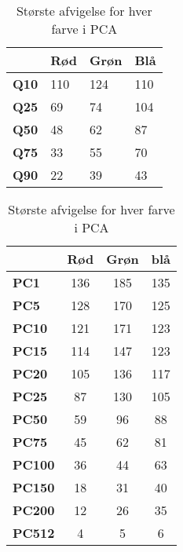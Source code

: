 \begin{table}
\begin{minipage}[b]{0.45\textwidth}
\centering
\begin{tabular}{|l|l|l|l|}
\hline
	& \textbf{Rød}	& \textbf{Grøn}	& \textbf{Blå}	\\ \hline
\textbf{Q10}	& 110	& 124	& 110	\\ \hline
\textbf{Q25}	& 69		& 74		& 104	\\ \hline
\textbf{Q50}	& 48		& 62		& 87		\\ \hline
\textbf{Q75}	& 33		& 55		& 70		\\ \hline
\textbf{Q90}	& 22		& 39		& 43		\\ \hline
\end{tabular}
\caption{Største afvigelse for hver farve i DCT}
\label{tb:afvigelse_DCT}
\end{minipage}
\hspace{0.5cm}
\begin{minipage}[b]{0.45\textwidth}
\centering
\begin{tabular}{|l|c|c|c|}
\hline 
      & \textbf{Rød} & \textbf{Grøn} & \textbf{blå} 		  \\ \hline
\textbf{PC1}   & 136 & 185 & 135            \\ \hline
\textbf{PC5}   & 128 & 170 & 125            \\ \hline
\textbf{PC10}  & 121 & 171 & 123            \\ \hline
\textbf{PC15}  & 114 & 147 & 123            \\ \hline
\textbf{PC20}  & 105 & 136 & 117            \\ \hline
\textbf{PC25}  & 87  & 130 & 105            \\ \hline
\textbf{PC50}  & 59  & 96  & 88             \\ \hline
\textbf{PC75}  & 45  & 62  & 81             \\ \hline
\textbf{PC100} & 36  & 44  & 63             \\ \hline
\textbf{PC150} & 18  & 31  & 40             \\ \hline
\textbf{PC200} & 12  & 26  & 35             \\ \hline
\textbf{PC512} & 4   & 5   & 6              \\ \hline
\end{tabular}
\caption{Største afvigelse for hver farve i PCA}
\label{tb:afvigelse_PCAl}
\end{minipage}
\end{table}

